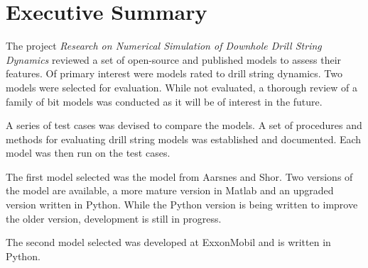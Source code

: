 \chapter*{Executive Summary}

The project \emph{Research on Numerical Simulation of Downhole Drill String Dynamics} reviewed a set of open-source and published models to assess their features.  Of primary interest were models rated to drill string dynamics.  Two models were selected for evaluation.  While not evaluated, a thorough review of a family of bit models was conducted as it will be of interest in the future.

A series of test cases was devised to compare the models.  A set of procedures and methods for evaluating drill string models was established and documented.  Each model was then run on the test cases.

The first model selected was the model from Aarsnes and Shor.  Two versions of the model are available, a more mature version in Matlab and an upgraded version written in Python.  While the Python version is being written to improve the older version, development is still in progress.

The second model selected was developed at ExxonMobil and is written in Python. 